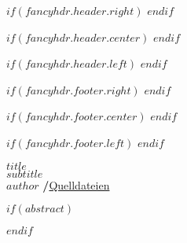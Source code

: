 \fancyhf{} %
$if(fancyhdr.header.right)$
$endif$

$if(fancyhdr.header.center)$
$endif$

$if(fancyhdr.header.left)$
$endif$

$if(fancyhdr.footer.right)$
$endif$

$if(fancyhdr.footer.center)$
$endif$

$if(fancyhdr.footer.left)$
$endif$

\makeatletter
\begin{center}
  \vspace*{0.5cm}
  \textbf{\textsf{\Huge $title$}}\\
  \vspace{0.1cm}
  \textsf{\textit{\large $subtitle$}}\\
  \vspace{0.5cm}
  \textsf{\large $author$ \hspace{0.3cm}\textbf{/}\hspace{0.3cm}\mbox{\large \faGithub\space \href{$source.github$}{Quelldateien}}}
\end{center}
\makeatother
\normalfont

$if(abstract)$
\begin{abstract}
$abstract$
\end{abstract}
$endif$
